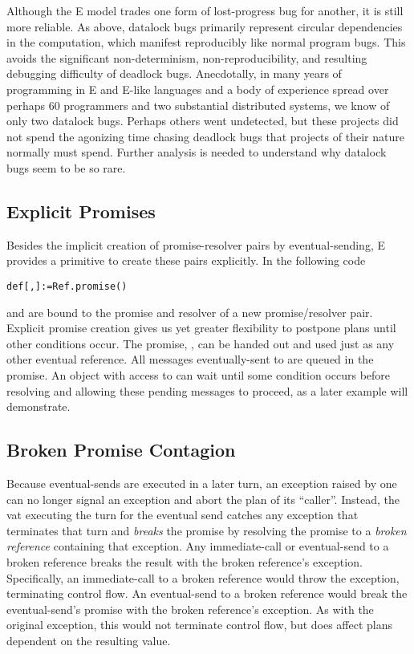 \documentclass{llncs}
\begin{document}
Although the E model trades one form of lost-progress bug for another,
it is still more reliable. As above, datalock bugs primarily represent
circular dependencies in the computation, which manifest reproducibly
like normal program bugs. This avoids the significant non-determinism,
non-reproducibility, and resulting debugging difficulty of deadlock
bugs. Anecdotally, in many years of programming in E and E-like
languages and a body of experience spread over perhaps 60 programmers
and two substantial distributed systems, we know of only two datalock
bugs. Perhaps others went undetected, but these projects did not spend
the agonizing time chasing deadlock bugs that projects of their nature
normally must spend.  Further analysis is needed to understand why datalock
bugs seem to be so rare.

\subsection{Explicit Promises}

Besides the implicit creation of promise-resolver pairs by
eventual-sending, E provides a primitive to create these pairs
explicitly. In the following code
%
\begin{alltt}
    def [, ] := Ref.promise()
\end{alltt}
%
 and  are bound to the promise and resolver of a new
promise/resolver pair. Explicit promise creation gives us yet greater
flexibility to postpone plans until other conditions occur. The
promise, , can be handed out and used just as any other
eventual reference. All messages eventually-sent to  are queued
in the promise. An object with access to  can wait until some
condition occurs before resolving  and allowing these pending
messages to proceed, as a later example will demonstrate.

\subsection{Broken Promise Contagion}

Because eventual-sends are executed in a later turn, an exception
raised by one can no longer signal an exception and abort the plan of
its ``caller''. Instead, the vat executing the turn for the eventual
send catches any exception that terminates that turn and
\emph{breaks} the promise by resolving the promise to a \emph{broken
reference} containing that exception.  Any immediate-call or
eventual-send to a broken reference breaks the result with the broken
reference's exception.  Specifically, an immediate-call to a broken
reference would throw the exception, terminating control flow.  An
eventual-send to a broken reference would break the eventual-send's
promise with the broken reference's exception. As with the original
exception, this would not terminate control flow, but does affect
plans dependent on the resulting value.
\end{document}
